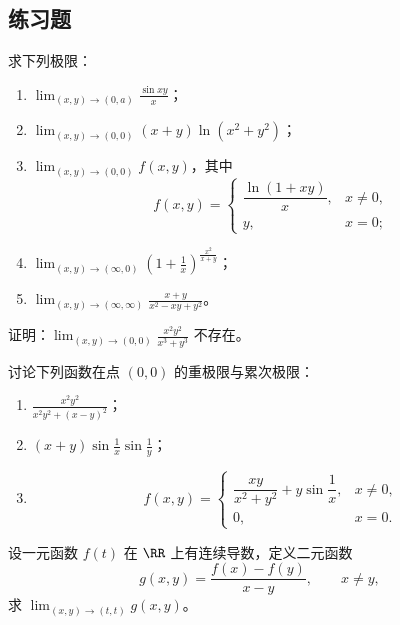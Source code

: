 \subsection{练习题}

\begin{xexercise}[1]
求下列极限：
  \begin{enumerate}[label=(\arabic*)]
    \item $\displaystyle\lim_{(x,y)\to(0,a)}\frac{\sin xy}{x}$；
    \item $\displaystyle\lim_{(x,y)\to(0,0)}(x+y)\ln(x^2+y^2)$；
    \item $\displaystyle\lim_{(x,y)\to(0,0)}f(x,y)$，其中
    \[
      f(x,y)=
      \begin{cases}
        \dfrac{\ln(1+xy)}{x}, & x\ne0,\\[4pt]
        y, & x=0;
      \end{cases}
    \]
    \item $\displaystyle\lim_{(x,y)\to(\infty,0)}\left(1+\frac1x\right)^{\frac{x^2}{x+y}}$；
    \item $\displaystyle\lim_{(x,y)\to(\infty,\infty)}\frac{x+y}{x^2-xy+y^2}$。
  \end{enumerate}
\end{xexercise}

\begin{xexercise}[2]
证明：$\displaystyle\lim_{(x,y)\to(0,0)}\frac{x^2y^2}{x^3+y^3}$ 不存在。
\end{xexercise}

\begin{xexercise}[3]
讨论下列函数在点 $(0,0)$ 的重极限与累次极限：
  \begin{enumerate}[label=(\arabic*)]
    \item $\displaystyle\frac{x^2y^2}{x^2y^2+(x-y)^2}$；
    \item $\displaystyle(x+y)\sin\frac1x\sin\frac1y$；
    \item
    \[
      f(x,y)=
      \begin{cases}
        \dfrac{xy}{x^2+y^2}+y\sin\dfrac1x, & x\ne0,\\[5pt]
        0, & x=0.
      \end{cases}
    \]
  \end{enumerate}
\end{xexercise}

\begin{xexercise}[4]
设一元函数 $f(t)$ 在 $\RR$ 上有连续导数，定义二元函数
  \[
    g(x,y)=\frac{f(x)-f(y)}{x-y},\qquad x\ne y,
  \]
  求 $\displaystyle\lim_{(x,y)\to(t,t)}g(x,y)$。
\end{xexercise}

